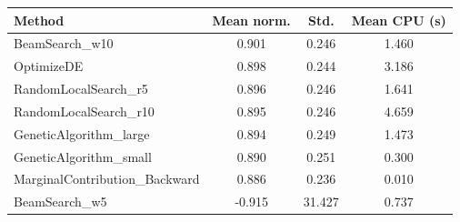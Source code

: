 \begin{tabular}{lccc}
\toprule
Method & Mean norm. & Std. & Mean CPU (s) \\

\midrule
BeamSearch\_w10 & 0.901 & 0.246 & 1.460 \\
OptimizeDE & 0.898 & 0.244 & 3.186 \\
RandomLocalSearch\_r5 & 0.896 & 0.246 & 1.641 \\
RandomLocalSearch\_r10 & 0.895 & 0.246 & 4.659 \\
GeneticAlgorithm\_large & 0.894 & 0.249 & 1.473 \\
GeneticAlgorithm\_small & 0.890 & 0.251 & 0.300 \\
MarginalContribution\_Backward & 0.886 & 0.236 & 0.010 \\
BeamSearch\_w5 & -0.915 & 31.427 & 0.737 \\
\bottomrule
\end{tabular}
